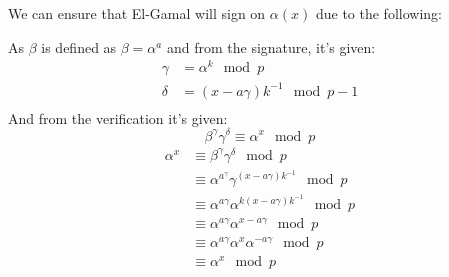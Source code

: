 



We can ensure that El-Gamal will sign on $\alpha(x)$ due to the
following:

As $\beta$ is defined as $\beta = \alpha^{a}$ and from the signature, it's given:
\begin{align*}
  \gamma &= \alpha^k \mod p \\
  \delta &= (x - a \gamma)k^{-1} \mod p - 1 \\
\end{align*}
And from the verification it's given:
\[ \beta^{\gamma}\gamma^{\delta} \equiv \alpha^x \mod p\]
\begin{align*}
  \alpha^x &\equiv \beta^{\gamma}\gamma^{\delta} \mod p\\
  &\equiv \alpha^{a^{\gamma}} \gamma^{(x-a\gamma)k^{-1}} \mod p\\
  &\equiv \alpha^{a\gamma} \alpha^{k(x-a\gamma)k^{-1}} \mod p\\
  &\equiv \alpha^{a\gamma} \alpha^{x-a\gamma} \mod p\\
  &\equiv \alpha^{a\gamma} \alpha^{x}\alpha^{-a\gamma} \mod p\\
  &\equiv \alpha^x \mod p
\end{align*}
